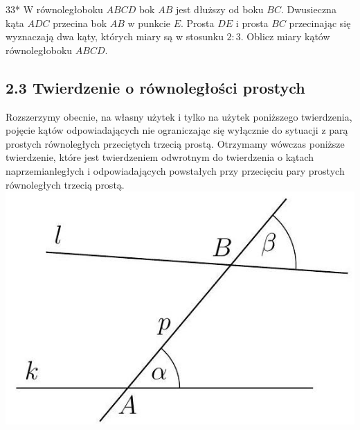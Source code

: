 \documentclass[10pt]{article}
\begin{document}
33* W równoległoboku \(A B C D\) bok \(A B\) jest dłuższy od boku \(B C\). Dwusieczna kąta \(A D C\) przecina bok \(A B\) w punkcie \(E\). Prosta \(D E\) i prosta \(B C\) przecinając się wyznaczają dwa kąty, których miary są w stosunku \(2: 3\). Oblicz miary kątów równoległoboku \(A B C D\).

\subsection*{2.3 Twierdzenie o równoległości prostych}
Rozszerzymy obecnie, na własny użytek i tylko na użytek poniższego twierdzenia, pojęcie kątów odpowiadających nie ograniczając się wyłącznie do sytuacji z parą prostych równoległych przeciętych trzecią prostą. Otrzymamy wówczas poniższe twierdzenie, które jest twierdzeniem odwrotnym do twierdzenia o kątach naprzemianległych i odpowiadających powstałych przy przecięciu pary prostych równoległych trzecią prostą.\\
\includegraphics[max width=\textwidth, center]{2024_11_21_71f62bd117d375398909g-026}
\end{document}
